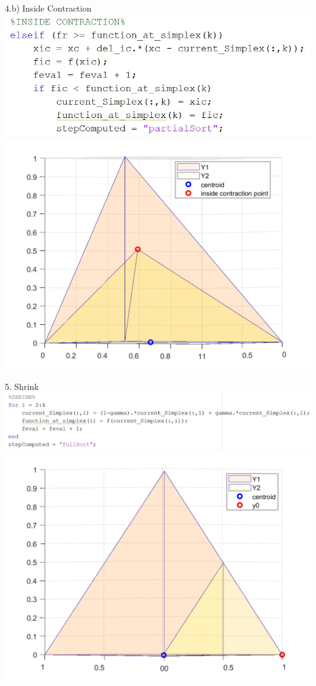 \documentclass{beamer}
\begin{document}
\begin{frame}{4.b) Inside Contraction}
	\centering
	\includegraphics[width=0.45\linewidth]{IC}
	\includegraphics[width=0.45\linewidth]{ICFig}
\end{frame}

\begin{frame}{5. Shrink}
	\centering
	\includegraphics[width=0.45\linewidth]{Shrink}
	\includegraphics[width=0.45\linewidth]{ShrinkFig}
\end{frame}
\end{document}

